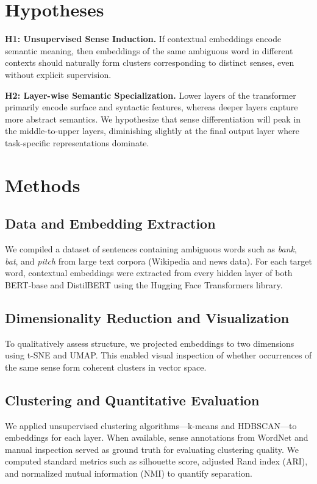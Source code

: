 \documentclass{template}
\begin{document}
\section*{Hypotheses}
\textbf{H1: Unsupervised Sense Induction.}
If contextual embeddings encode semantic meaning, then embeddings of the same ambiguous word in different contexts should naturally form clusters corresponding to distinct senses, even without explicit supervision.

\textbf{H2: Layer-wise Semantic Specialization.}
Lower layers of the transformer primarily encode surface and syntactic features, whereas deeper layers capture more abstract semantics. We hypothesize that sense differentiation will peak in the middle-to-upper layers, diminishing slightly at the final output layer where task-specific representations dominate.


\section*{Methods}
\subsection*{Data and Embedding Extraction}
We compiled a dataset of sentences containing ambiguous words such as \textit{bank}, \textit{bat}, and \textit{pitch} from large text corpora (Wikipedia and news data). For each target word, contextual embeddings were extracted from every hidden layer of both BERT-base and DistilBERT using the Hugging Face Transformers library.

\subsection*{Dimensionality Reduction and Visualization}
To qualitatively assess structure, we projected embeddings to two dimensions using t-SNE and UMAP. This enabled visual inspection of whether occurrences of the same sense form coherent clusters in vector space.

\subsection*{Clustering and Quantitative Evaluation}
We applied unsupervised clustering algorithms---k-means and HDBSCAN---to embeddings for each layer. When available, sense annotations from WordNet and manual inspection served as ground truth for evaluating clustering quality. We computed standard metrics such as silhouette score, adjusted Rand index (ARI), and normalized mutual information (NMI) to quantify separation.
\end{document}
